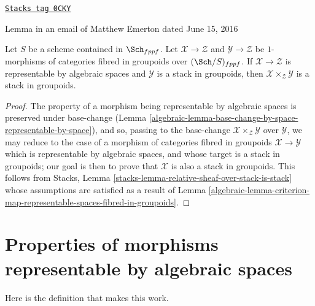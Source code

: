 \begin{lemma}
\label{algebraic-lemma-get-a-stack}
\href{https://stacks.math.columbia.edu/tag/0CKY}{\texttt{Stacks tag 0CKY}}

\begin{reference}
Lemma in an email of Matthew Emerton dated June 15, 2016
\end{reference}
Let $S$ be a scheme contained in $\Sch_{fppf}$.
Let $\mathcal{X} \to \mathcal{Z}$ and $\mathcal{Y} \to \mathcal{Z}$
be $1$-morphisms of categories fibred in groupoids over $(\Sch/S)_{fppf}$.
If $\mathcal{X} \to \mathcal{Z}$ is representable by algebraic spaces
and $\mathcal{Y}$ is a stack in groupoids, then
$\mathcal{X} \times_\mathcal{Z} \mathcal{Y}$ is a stack in groupoids.
\end{lemma}

\begin{proof}

The property of a morphism being representable by algebraic spaces
is preserved under base-change
(Lemma \ref{algebraic-lemma-base-change-by-space-representable-by-space}),
and so, passing to the base-change
$\mathcal{X} \times_\mathcal{Z} \mathcal{Y}$ over $\mathcal{Y}$,
we may reduce to the case of a morphism of categories
fibred in groupoids $\mathcal{X} \to \mathcal{Y}$
which is representable by algebraic spaces, and
whose target is a stack in groupoids; our goal is then to prove
that $\mathcal{X}$ is also a stack in groupoids.
This follows from Stacks, Lemma
\ref{stacks-lemma-relative-sheaf-over-stack-is-stack}
whose assumptions are satisfied as a result of
Lemma \ref{algebraic-lemma-criterion-map-representable-spaces-fibred-in-groupoids}.
\end{proof}

\section{Properties of morphisms representable by algebraic spaces}
\label{algebraic-section-representable-properties}
Here is the definition that makes this work.

